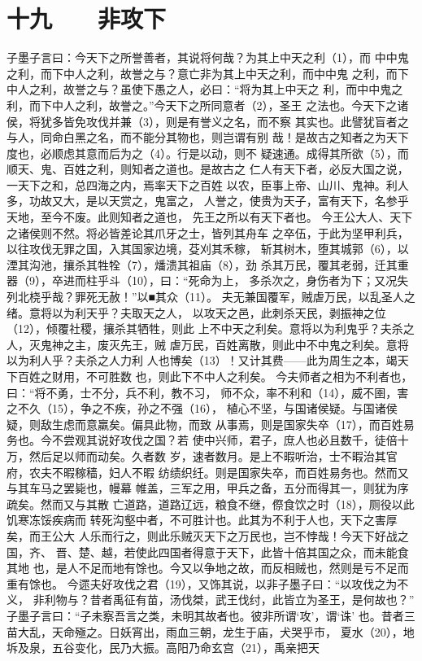 \documentclass[12pt,UTF8]{ctexbook}
\begin{document}
\chapter{十九　　非攻下}

子墨子言曰：今天下之所誉善者，其说将何哉？为其上中天之利（1），而 
中中鬼之利，而下中人之利，故誉之与？意亡非为其上中天之利，而中中鬼 
之利，而下中人之利，故誉之与？虽使下愚之人，必曰：“将为其上中天之 
利，而中中鬼之利，而下中人之利，故誉之。”今天下之所同意者（2），圣王 
之法也。今天下之诸侯，将犹多皆免攻伐并兼（3），则是有誉义之名，而不察 
其实也。此譬犹盲者之与人，同命白黑之名，而不能分其物也，则岂谓有别 
哉！是故古之知者之为天下度也，必顺虑其意而后为之（4）。行是以动，则不 
疑速通。成得其所欲（5），而顺天、鬼、百姓之利，则知者之道也。是故古之 
仁人有天下者，必反大国之说，一天下之和，总四海之内，焉率天下之百姓 
以农，臣事上帝、山川、鬼神。利人多，功故又大，是以天赏之，鬼富之， 
人誉之，使贵为天子，富有天下，名参乎天地，至今不废。此则知者之道也， 
先王之所以有天下者也。 
今王公大人、天下之诸侯则不然。将必皆差论其爪牙之士，皆列其舟车 
之卒伍，于此为坚甲利兵，以往攻伐无罪之国，入其国家边境，芟刈其禾稼， 
斩其树木，堕其城郭（6），以湮其沟池，攘杀其牲牷（7），燔溃其祖庙（8），劲 
杀其万民，覆其老弱，迁其重器（9），卒进而柱乎斗（10），曰：“死命为上， 
多杀次之，身伤者为下；又况失列北桡乎哉？罪死无赦！”以■其众（11）。 
夫无兼国覆军，贼虐万民，以乱圣人之绪。意将以为利天乎？夫取天之人， 
以攻天之邑，此刺杀天民，剥振神之位（12），倾覆社稷，攘杀其牺牲，则此 
上不中天之利矣。意将以为利鬼乎？夫杀之人，灭鬼神之主，废灭先王，贼 
虐万民，百姓离散，则此中不中鬼之利矣。意将以为利人乎？夫杀之人力利 
人也博矣（13）！又计其费——此为周生之本，竭天下百姓之财用，不可胜数 
也，则此下不中人之利矣。 
今夫师者之相为不利者也，曰：“将不勇，士不分，兵不利，教不习， 
师不众，率不利和（14），威不圉，害之不久（15），争之不疾，孙之不强（16）， 
植心不坚，与国诸侯疑。与国诸侯疑，则敌生虑而意羸矣。偏具此物，而致 
从事焉，则是国家失卒（17），而百姓易务也。今不尝观其说好攻伐之国？若 
使中兴师，君子，庶人也必且数千，徒倍十万，然后足以师而动矣。久者数 
岁，速者数月。是上不暇听治，士不暇治其官府，农夫不暇稼穑，妇人不暇 
纺绩织纴。则是国家失卒，而百姓易务也。然而又与其车马之罢毙也，幔幕 
帷盖，三军之用，甲兵之备，五分而得其一，则犹为序疏矣。然而又与其散 
亡道路，道路辽远，粮食不继，傺食饮之时（18），厕役以此饥寒冻馁疾病而 
转死沟壑中者，不可胜计也。此其为不利于人也，天下之害厚矣，而王公大 
人乐而行之，则此乐贼灭天下之万民也，岂不悖哉！今天下好战之国，齐、 
晋、楚、越，若使此四国者得意于天下，此皆十倍其国之众，而未能食其地 
也，是人不足而地有馀也。今又以争地之故，而反相贼也，然则是亏不足而 
重有馀也。 
今遝夫好攻伐之君（19），又饰其说，以非子墨子曰：“以攻伐之为不义， 
非利物与？昔者禹征有苗，汤伐桀，武王伐纣，此皆立为圣王，是何故也？” 
子墨子言曰：“子未察吾言之类，未明其故者也。彼非所谓‘攻’，谓‘诛’ 
也。昔者三苗大乱，天命殛之。日妖宵出，雨血三朝，龙生于庙，犬哭乎市， 
夏水（20），地坼及泉，五谷变化，民乃大振。高阳乃命玄宫（21），禹亲把天 
\end{document}
